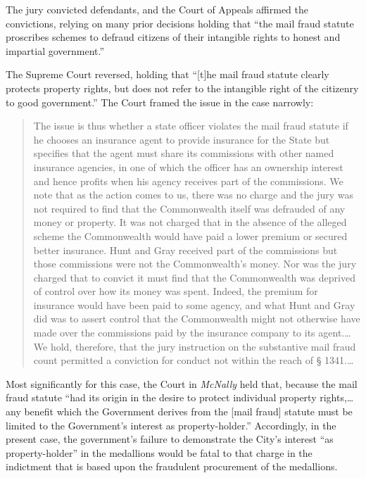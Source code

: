 The jury convicted defendants, and the Court of Appeals affirmed the
convictions, relying on many prior decisions holding that ``the mail fraud
statute proscribes schemes to defraud citizens of their intangible rights to
honest and impartial government.''

The Supreme Court reversed, holding that ``[t]he mail fraud statute clearly
protects property rights, but does not refer to the intangible right of the
citizenry to good government.'' The Court framed the issue in the case
narrowly:
\begin{quote}
The issue is thus whether a state officer violates the mail fraud statute if he
chooses an insurance agent to provide insurance for the State but specifies
that the agent must share its commissions with other named insurance agencies,
in one of which the officer has an ownership interest and hence profits when
his agency receives part of the commissions. We note that as the action comes
to us, there was no charge and the jury was not required to find that the
Commonwealth itself was defrauded of any money or property. It was not charged
that in the absence of the alleged scheme the Commonwealth would have paid a
lower premium or secured better insurance. Hunt and Gray received part of the
commissions but those commissions were not the Commonwealth's money. Nor was
the jury charged that to convict it must find that the Commonwealth was
deprived of control over how its money was spent. Indeed, the premium for
insurance would have been paid to some agency, and what Hunt and Gray did was
to assert control that the Commonwealth might not otherwise have made over the
commissions paid by the insurance company to its agent.\ldots We hold,
therefore,
that the jury instruction on the substantive mail fraud count permitted a
conviction for conduct not within the reach of {\S}
1341.\ldots
\end{quote}

Most significantly for this case, the Court in \textit{McNally} held that,
because the mail fraud statute ``had its origin in the desire to protect
individual property rights,\ldots any benefit which the Government derives from
the [mail fraud] statute must be limited to the Government's interest as
property-holder.'' Accordingly, in the present case, the government's failure
to demonstrate the City's interest ``as property-holder'' in the medallions
would be fatal to that charge in the indictment that is based upon the
fraudulent procurement of the medallions.

